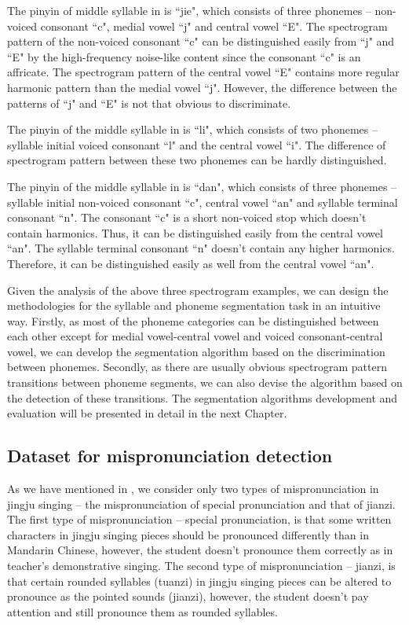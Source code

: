 The pinyin of middle syllable in  is ``jie", which consists of three phonemes -- non-voiced consonant ``c", medial vowel ``j" and central vowel ``E". The spectrogram pattern of the non-voiced consonant ``c" can be distinguished easily from ``j" and ``E" by the high-frequency noise-like content since the consonant ``c" is an affricate. The spectrogram pattern of the central vowel ``E" contains more regular harmonic pattern than the medial vowel ``j". However, the difference between the patterns of ``j" and ``E" is not that obvious to discriminate.
 
The pinyin of the middle syllable in  is ``li", which consists of two phonemes -- syllable initial voiced consonant ``l" and the central vowel ``i". The difference of spectrogram pattern between these two phonemes can be hardly distinguished.

The pinyin of the middle syllable in  is ``dan", which consists of three phonemes -- syllable initial non-voiced consonant ``c", central vowel ``an" and syllable terminal consonant ``n". The consonant ``c" is a short non-voiced stop which doesn't contain harmonics. Thus, it can be distinguished easily from the central vowel ``an". The syllable terminal consonant ``n" doesn't contain any higher harmonics. Therefore, it can be distinguished easily as well from the central vowel ``an".

Given the analysis of the above three spectrogram examples, we can design the methodologies for the syllable and phoneme segmentation task in an intuitive way. Firstly, as most of the phoneme categories can be distinguished between each other except for medial vowel-central vowel and voiced consonant-central vowel, we can develop the segmentation algorithm based on the discrimination between phonemes. Secondly, as there are usually obvious spectrogram pattern transitions between phoneme segments, we can also devise the algorithm based on the detection of these transitions. The segmentation algorithms development and evaluation will be presented in detail in the next Chapter.

\subsection{Dataset for mispronunciation detection}\label{sec:ch4:dataset_mispronunciation}

As we have mentioned in , we consider only two types of mispronunciation in jingju singing -- the mispronunciation of special pronunciation and that of \gls{jianzi}. The first type of mispronunciation -- special pronunciation, is that some written characters in jingju singing pieces should be pronounced differently than in Mandarin Chinese, however, the student doesn't pronounce them correctly as in teacher's demonstrative singing. The second type of mispronunciation -- \gls{jianzi}, is that certain rounded syllables (\gls{tuanzi}) in jingju singing pieces can be altered to pronounce as the pointed sounds (\gls{jianzi}), however, the student doesn't pay attention and still pronounce them as rounded syllables. 

